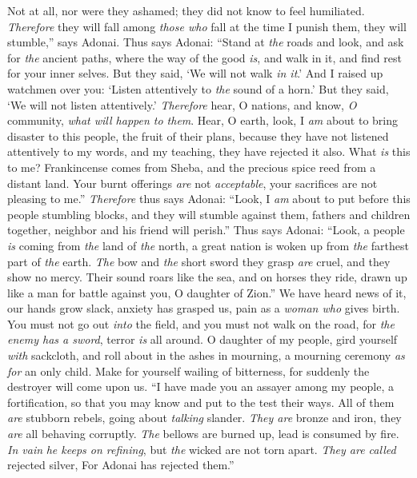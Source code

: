 \begin{biblechapter}
Not at all, nor were they ashamed; they did not know to feel humiliated. 
\textit{Therefore} they will fall among \textit{those who} fall at the time I punish them, 
they will stumble,” says Adonai.
\verse Thus says Adonai: “Stand at \textit{the} roads and look, 
and ask for \textit{the} ancient paths, where the way of the good \textit{is}, 
and walk in it, and find rest for your inner selves. 
But they said, ‘We will not walk \textit{in it}.’
\verse And I raised up watchmen over you: 
‘Listen attentively to \textit{the} sound of a horn.’ 
But they said, ‘We will not listen attentively.’
\verse \textit{Therefore} hear, O nations, and know, \textit{O} community, 
\textit{what will happen to them}.
\verse Hear, O earth, 
look, I \textit{am} about to bring disaster to this people, 
the fruit of their plans, 
because they have not listened attentively to my words, 
and my teaching, they have rejected it also.
\verse What \textit{is} this to me? 
Frankincense comes from Sheba, 
and the precious spice reed from a distant land. 
Your burnt offerings \textit{are} not \textit{acceptable}, 
your sacrifices are not pleasing to me.”
\verse \textit{Therefore} thus says Adonai: 
“Look, I \textit{am} about to put before this people stumbling blocks, 
and they will stumble against them, 
fathers and children together, 
neighbor and his friend will perish.”
\verse Thus says Adonai: 
“Look, a people \textit{is} coming from \textit{the} land of \textit{the} north, 
a great nation is woken up from \textit{the} farthest part of \textit{the} earth.
\verse \textit{The} bow and \textit{the} short sword they grasp \textit{are} cruel, 
and they show no mercy. 
Their sound roars like the sea, and on horses they ride, 
drawn up like a man for battle against you, O daughter of Zion.”
\verse We have heard news of it, 
our hands grow slack, 
anxiety has grasped us, 
pain as a \textit{woman who} gives birth.
\verse You must not go out \textit{into} the field, 
and you must not walk on the road, 
for \textit{the enemy has a sword}, 
terror \textit{is} all around.
\verse O daughter of my people, 
gird yourself \textit{with} sackcloth, 
and roll about in the ashes in mourning, 
a mourning ceremony \textit{as for} an only child. 
Make for yourself wailing of bitterness, 
for suddenly the destroyer will come upon us.
\verse “I have made you an assayer among my people, a fortification, 
so that you may know and put to the test their ways.
\verse All of them \textit{are} stubborn rebels, 
going about \textit{talking} slander. 
\textit{They are} bronze and iron, 
they \textit{are} all behaving corruptly.
\verse \textit{The} bellows are burned up, 
lead is consumed by fire. 
\textit{In vain} \textit{he keeps on refining}, 
but \textit{the} wicked are not torn apart.
\verse \textit{They are called} rejected silver, 
For Adonai has rejected them.”
\end{biblechapter}

